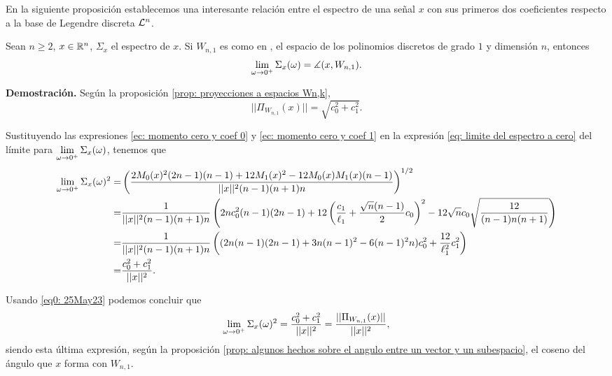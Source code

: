 En la siguiente proposición establecemos
una interesante relación entre el espectro de una señal $x$
con sus primeros dos coeficientes respecto a la base
de Legendre discreta $\mathcal{L}^{n}$.
\begin{prop}
\label{prop: relacion limite cero con legendre}
Sean $n \geq 2$, $x \in \mathbb{R}^{n}$,
$\Sigma_{x}$ el espectro de $x$.
Si $W_{n,1}$ es como en , el espacio
de los polinomios discretos de grado $1$ y dimensión $n$, entonces
\begin{equation}
\label{eq: limite por cero como angulo}
\lim\limits_{\omega \rightarrow 0^{+}}{
\Sigma_{x}(\omega)} = \measuredangle(x, W_{n,1}).
\end{equation}
\end{prop}
\noindent
\textbf{Demostración.}
Según la proposición 
\ref{prop: proyecciones a espacios Wn,k}, 
\begin{equation}
\label{eq0: 25May23} 
||\Pi_{W_{n,1}}(x)|| = \sqrt{c_{0}^{2} + c_{1}^{2}}.
\end{equation}

Sustituyendo las expresiones 
\eqref{ec: momento cero y coef 0} y
\eqref{ec: momento cero y coef 1} en la expresión 
\eqref{eq: limite del espectro a cero} del límite para 
$\lim\limits_{\omega \rightarrow 0^{+}}{\Sigma_{x}(\omega)}$,
tenemos que
\begin{align*}
\lim\limits_{\omega \rightarrow 0^{+}}{\Sigma_{x}(\omega)^{2}}
= & 
\left(
\frac{
2M_{0}(x)^{2}(2n-1)(n-1) + 12M_{1}(x)^{2} - 12M_{0}(x)M_{1}(x)(n-1)
}{
||x||^{2} (n-1)(n+1)n}
\right)^{1/2} \\
= & \frac{1}{||x||^{2}
(n-1)(n+1)n
} 
\left(
2nc_{0}^{2}(n-1)(2n-1) + 12
\left(
\frac{c_{1}}{\ell_{1}} + 
\frac{\sqrt{n}(n-1)}{2}c_{0}
\right)^{2}-12
\sqrt{n} c_{0} \sqrt{\frac{12}{
(n-1)n(n+1)
}} 
\right) \\
= & \frac{1}{||x||^{2}
(n-1)(n+1)n}
\left(
(2n(n-1)(2n-1) + 3n(n-1)^{2}-6(n-1)^{2}n)c_{0}^{2}
+ \frac{12}{\ell^{2}_{1}}c_{1}^{2}
\right) \\
= & \frac{c_{0}^{2} + c_{1}^{2}}{||x||^{2}}.
\end{align*}

Usando \eqref{eq0: 25May23} podemos concluir
que
\[
\lim\limits_{\omega \rightarrow 0^{+}}{\Sigma_{x}(\omega)^{2}}
=  \frac{c_{0}^{2} + c_{1}^{2}}{||x||^{2}}
=  \frac{||\Pi_{W_{n,1}}(x)||}{||x||^{2}},
\]
siendo esta última expresión, según la proposición
\ref{prop: algunos hechos sobre el angulo entre un vector y un subespacio}, 
el coseno del ángulo que $x$ forma con $W_{n,1}$.  
\QEDB
\vspace{0.2cm}

